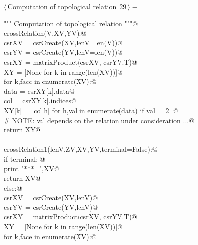 \documentclass[11pt,oneside]{article}    %
\begin{document}
\begin{flushleft} \small \label{scrap47}
\protect{}$\langle\,$Computation of topological relation\nobreak\ {\footnotesize 29}$\,\rangle\equiv$
\vspace{-1ex}
\begin{list}{}{} \item
\mbox{}\verb@""" Computation of topological relation """@\\
\mbox{}\verb@def crossRelation(V,XV,YV):@\\
\mbox{}\verb@    csrXV = csrCreate(XV,lenV=len(V))@\\
\mbox{}\verb@    csrYV = csrCreate(YV,lenV=len(V))@\\
\mbox{}\verb@    csrXY = matrixProduct(csrXV, csrYV.T)@\\
\mbox{}\verb@    XY = [None for k in range(len(XV))]@\\
\mbox{}\verb@    for k,face in enumerate(XV):@\\
\mbox{}\verb@        data = csrXY[k].data@\\
\mbox{}\verb@        col = csrXY[k].indices@\\
\mbox{}\verb@        XY[k] = [col[h] for h,val in enumerate(data) if val==2] @\\
\mbox{}\verb@        # NOTE: val depends on the relation under consideration ...@\\
\mbox{}\verb@    return XY@\\
\mbox{}\verb@@\\
\mbox{}\verb@def crossRelation1(lenV,ZV,XV,YV,terminal=False):@\\
\mbox{}\verb@    if terminal:  @\\
\mbox{}\verb@        print "\n****\nXV =",XV@\\
\mbox{}\verb@        return XV@\\
\mbox{}\verb@    else:@\\
\mbox{}\verb@        csrXV = csrCreate(XV,lenV)@\\
\mbox{}\verb@        csrYV = csrCreate(YV,lenV)@\\
\mbox{}\verb@        csrXY = matrixProduct(csrXV, csrYV.T)@\\
\mbox{}\verb@        XY = [None for k in range(len(XV))]@\\
\mbox{}\verb@        for k,face in enumerate(XV):@\\

\end{list}
\end{flushleft}
\end{document}
